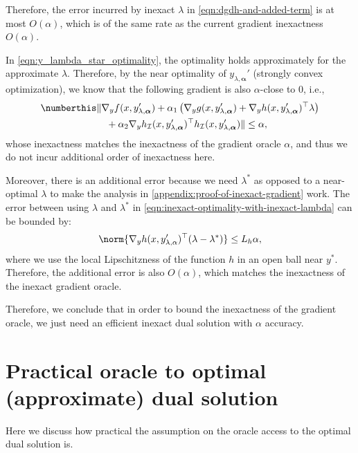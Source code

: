     Therefore, the error incurred by inexact $\lambda$ in \cref{eqn:dgdh-and-added-term} is at most $O(\alpha)$, which is of the same rate as the current gradient inexactness $O(\alpha)$.
    
    In \cref{eqn:y_lambda_star_optimality}, the optimality holds approximately for the approximate $\lambda$. Therefore, by the near optimality of $y_{\lambda,\boldsymbol{\alpha}}'$ (strongly convex optimization), we know that the following gradient is also $\alpha$-close to $0$, i.e.,
    \begin{align*}\numberthis\label{eqn:inexact-optimality-with-inexact-lambda}
        & \|\nabla_y f(x,y_{\lambda,\boldsymbol{\alpha}}') + \alpha_1 \left( \nabla_y g(x,y_{\lambda,\boldsymbol{\alpha}}') + \nabla_y h(x,y_{\lambda,\boldsymbol{\alpha}}')^\top \lambda \right) \\
        &\quad + \alpha_2 \nabla_y h_\mathcal{I}(x,y_{\lambda,\boldsymbol{\alpha}}')^\top h_\mathcal{I}(x,y_{\lambda,\boldsymbol{\alpha}}')\| \leq \alpha, 
    \end{align*}
    whose inexactness matches the inexactness of the gradient oracle $\alpha$, and thus we do not incur additional order of inexactness here.
    
    Moreover, there is an additional error because we need $\lambda^*$ as opposed to a near-optimal $\lambda$ to make the analysis in \cref{appendix:proof-of-inexact-gradient} work. The error between using $\lambda$ and $\lambda^*$ in \cref{eqn:inexact-optimality-with-inexact-lambda} can be bounded by:
    \begin{align}\label{eqn:dual-convergence-merit-function-2}
        \norm{\nabla_y h(x,y'_{\lambda,\alpha})^\top (\lambda - \lambda^*)} \leq L_h \alpha, 
    \end{align}
    where we use the local Lipschitzness of the function $h$ in an open ball near $y^*$.
    Therefore, the additional error is also  $O(\alpha)$, which matches the inexactness of the inexact gradient oracle. 

Therefore, we conclude that in order to bound the inexactness of the gradient oracle, we just need an efficient inexact dual solution with $\alpha$ accuracy.


\section{Practical oracle to optimal (approximate) dual solution}
Here we discuss how practical the assumption on the oracle access to the optimal dual solution is.

